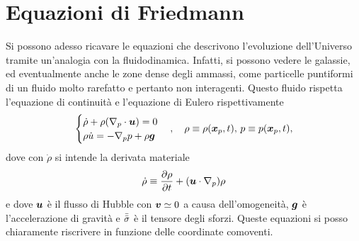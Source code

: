 \section{Equazioni di Friedmann}
Si possono adesso ricavare le equazioni che descrivono l'evoluzione dell'Universo tramite un'analogia con la fluidodinamica. Infatti, si possono vedere le galassie, ed eventualmente anche le zone dense degli ammassi, come particelle puntiformi di un fluido molto rarefatto e pertanto non interagenti. Questo fluido rispetta l'equazione di continuità e l'equazione di Eulero rispettivamente
\begin{equation}
\label{eq: equazioni di continuità e di Eulero}
    \begin{cases}
        \dot{\rho} + \rho(\nabla_p \cdot \bm{u}) = 0 \\
        \rho\dot{u} = -\nabla_pp + \rho\bm{g}
    \end{cases},\quad \rho \equiv \rho(\bm{x}_p,t),\, p \equiv p(\bm{x}_p,t),
\end{equation}
dove con $\dot{\rho}$ si intende la derivata materiale
\begin{equation}
    \dot{\rho} \equiv \frac{\partial \rho}{\partial t} + (\bm{u} \cdot \nabla_p) \rho
\end{equation}
e dove $\bm{u}$ è il flusso di Hubble con $\bm{v} \simeq 0$ a causa dell'omogeneità, $\bm{g}$ è l'accelerazione di gravità e $\bar{\bar{\sigma}}$ è il tensore degli sforzi. Queste equazioni si posso chiaramente riscrivere in funzione delle coordinate comoventi. 

